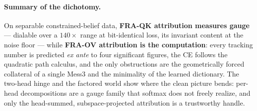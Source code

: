 \documentclass{article}
\begin{document}
\paragraph{Summary of the dichotomy.} On separable constrained-belief data,
\textbf{FRA-QK attribution measures gauge} --- dialable over a $140\times$ range at
bit-identical loss, its invariant content at the noise floor --- while
\textbf{FRA-OV attribution is the computation}: every tracking number is predicted
\emph{ex ante} to four significant figures, the CE follows the quadratic path calculus,
and the only obstructions are the geometrically forced collateral of a single Mess3 and
the minimality of the learned dictionary. The two-head hinge and the factored world
show where the clean picture bends: per-head decompositions are a gauge family that
softmax does not freely realize, and only the head-summed, subspace-projected
attribution is a trustworthy handle.
\end{document}
